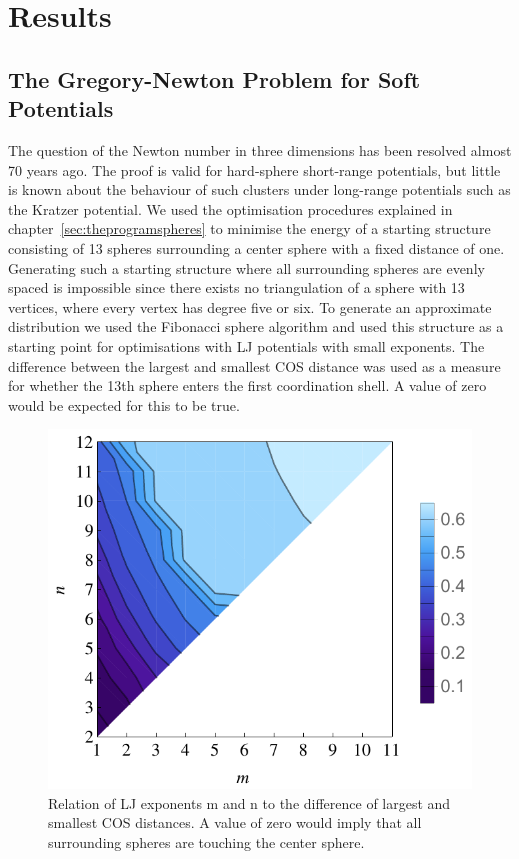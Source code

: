 \section{Results}
\label{sec:resultsgregorynewton}

\subsection{The Gregory-Newton Problem for Soft Potentials}
\label{sec:thegregorynewtonproblemforsoftpotentials}

The question of the Newton number in three dimensions has been resolved almost
70 years ago\autocite{Schutte_ProblemdreizehnKugeln_1952}. The proof is valid
for hard-sphere short-range potentials, but little is known about the behaviour
of such clusters under long-range potentials such as the Kratzer
potential\autocite{Kratzer_ultrarotenRotationsspektrenHalogenwasserstoffe_1920}.
We used the optimisation procedures explained in
chapter~\ref{sec:theprogramspheres} to minimise the energy of a starting
structure consisting of 13 spheres surrounding a center sphere with a fixed
distance of one. Generating such a starting structure where all surrounding
spheres are evenly spaced is impossible since there exists no triangulation of
a sphere with 13 vertices, where every vertex has degree five or
six\autocite{Schwerdtfeger_topologyfullerenes_2015}. To generate an approximate
distribution we used the Fibonacci sphere
algorithm\autocite{Gonzalez_MeasurementAreasSphere_2010,Keinert_SphericalFibonacciMapping_2015}
and used this structure as a starting point for optimisations with \ac{LJ}
potentials with small exponents. The difference between the largest and
smallest \ac{COS} distance was used as a measure for whether the 13th sphere
enters the first coordination shell. A value of zero would be expected for this
to be true.

\begin{figure}
    \centering
    \includegraphics[width=.8\textwidth]{gregory-newton/N14.pdf}
    \caption{Relation of \acs{LJ} exponents m and n to the difference of
    largest and smallest \acs{COS} distances.  A value of zero would imply that
    all surrounding spheres are touching the center sphere.}
    \label{fig:gregorynewton-N14}
\end{figure}

